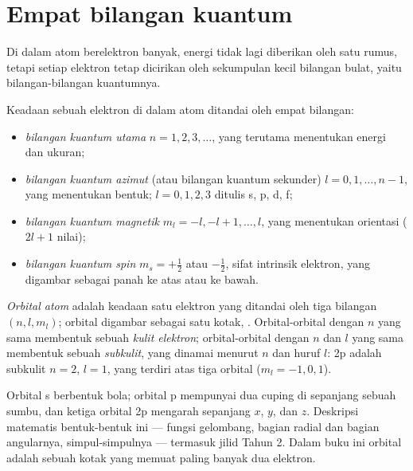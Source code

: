 \section{Empat bilangan kuantum}

Di dalam atom berelektron banyak, energi tidak lagi diberikan oleh satu
rumus, tetapi setiap elektron tetap dicirikan oleh sekumpulan kecil
bilangan bulat, yaitu bilangan-bilangan kuantumnya.

\begin{definition}\label{def:b1:quantum-numbers:quantum-number}
Keadaan sebuah elektron di dalam atom ditandai oleh empat bilangan:
\begin{itemize}
  \item \emph{bilangan kuantum utama}
        $n = 1, 2, 3, \dots$, yang terutama menentukan energi dan ukuran;
  \item \emph{bilangan kuantum azimut}
        (atau bilangan kuantum sekunder) $l = 0, 1, \dots, n-1$, yang
        menentukan bentuk; $l = 0, 1, 2, 3$ ditulis s, p, d, f;
  \item \emph{bilangan kuantum magnetik}
        $m_l = -l, -l+1, \dots, l$, yang menentukan orientasi ($2l + 1$
        nilai);
  \item \emph{bilangan kuantum spin}
        $m_s = +\tfrac12$ atau $-\tfrac12$, sifat intrinsik elektron,
        yang digambar sebagai panah ke atas atau ke bawah.
\end{itemize}
\end{definition}

\begin{definition}\label{def:b1:quantum-numbers:orbital}
\emph{Orbital atom} adalah keadaan satu elektron
yang ditandai oleh tiga bilangan $(n, l, m_l)$; orbital digambar sebagai
satu kotak, \omorbs{}. Orbital-orbital dengan $n$ yang sama membentuk
sebuah \emph{kulit elektron}; orbital-orbital
dengan $n$ dan $l$ yang sama membentuk sebuah
\emph{subkulit}, yang dinamai menurut $n$ dan huruf $l$:
2p adalah subkulit $n = 2$, $l = 1$, yang terdiri atas tiga orbital
($m_l = -1, 0, 1$).
\end{definition}

\begin{remark}\label{rem:b1:quantum-numbers:shapes}
Orbital s berbentuk bola; orbital p mempunyai dua cuping di sepanjang
sebuah sumbu, dan ketiga orbital 2p mengarah sepanjang $x$, $y$, dan $z$.
Deskripsi matematis bentuk-bentuk ini --- fungsi gelombang, bagian radial
dan bagian angularnya, simpul-simpulnya --- termasuk jilid Tahun 2. Dalam
buku ini orbital adalah sebuah kotak yang memuat paling banyak dua
elektron.
\end{remark}

